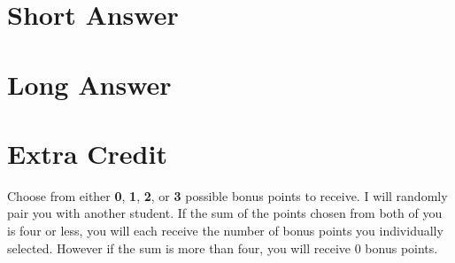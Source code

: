 \documentclass{article}
\begin{document}
\newpage

\section*{Short Answer}


\newpage

\section*{Long Answer}



\newpage



\section*{Extra Credit}
Choose from either \textbf{0}, \textbf{1}, \textbf{2}, or \textbf{3} possible bonus points to receive.
I will randomly pair you with another student. 
If the sum of the points chosen from both of you is four or less, you will each receive the number of bonus points you individually selected.
However if the sum is more than four, you will receive 0 bonus points.

\end{document}
